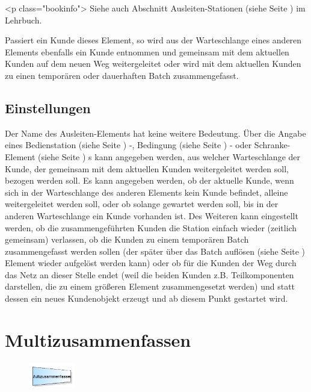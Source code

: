 <p class="bookinfo">
Siehe auch Abschnitt Ausleiten-Stationen (siehe Seite \pageref{ref:book:8.2.9}) im Lehrbuch.

Passiert ein Kunde dieses Element, so wird aus der Warteschlange eines anderen Elements ebenfalls ein Kunde entnommen
und gemeinsam mit dem aktuellen Kunden auf dem neuen Weg weitergeleitet oder wird mit dem aktuellen Kunden
zu einen temporären oder dauerhaften Batch zusammengefasst.

\subsection*{Einstellungen}

Der Name des Ausleiten-Elements hat keine weitere Bedeutung. Über die Angabe eines 
Bedienstation (siehe Seite \pageref{ref:ModelElementProcess}) -, Bedingung (siehe Seite \pageref{ref:ModelElementHold}) -
oder Schranke-Element (siehe Seite \pageref{ref:ModelElementBarrier}) s kann angegeben werden, aus welcher Warteschlange
der Kunde, der gemeinsam mit dem aktuellen Kunden weitergeleitet werden soll, bezogen werden soll.
Es kann angegeben werden, ob der aktuelle Kunde, wenn sich in der Warteschlange des anderen Elements kein
Kunde befindet, alleine weitergeleitet werden soll, oder ob solange gewartet werden soll, bis in der
anderen Warteschlange ein Kunde vorhanden ist. Des Weiteren kann eingestellt werden,
ob die zusammengeführten Kunden die Station einfach wieder (zeitlich gemeinsam) verlassen, ob die Kunden zu einem temporären
Batch zusammengefasst werden sollen (der später über das Batch auflösen (siehe Seite \pageref{ref:ModelElementSeparate}) Element
wieder aufgelöst werden kann) oder ob für die Kunden der Weg durch
das Netz an dieser Stelle endet (weil die beiden Kunden z.B. Teilkomponenten darstellen, die zu einem größeren Element
zusammengesetzt werden) und statt dessen ein neues Kundenobjekt erzeugt und ab diesem Punkt gestartet wird. 


\section{Multizusammenfassen}
\label{ref:ModelElementBatchMulti}

\begin{figure}
\vspace{-22pt}
\includegraphics[width=2cm]{imageModelElementBatchMulti.png}
\vspace{-22pt}
\end{figure}

